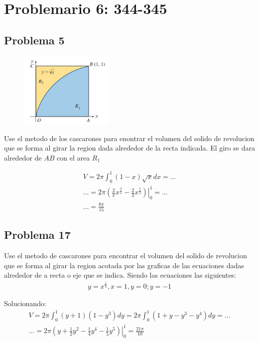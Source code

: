 \documentclass{article}
\begin{document}
\section{Problemario 6: 344-345}
\subsection{Problema 5}
\begin{figure}
  \includegraphics[width=0.4\textwidth]{multimedia/Problema5.jpeg}
\end{figure}
Use el metodo de los cascarones para enontrar el volumen del solido de revolucion que se forma al girar la region dada alrededor de la recta indicada.
El giro se dara alrededor de $ AB $ con el area $R_1$

\begin{align*}
  V = 2\pi\int_{0}^{1} (1-x)\sqrt{x}dx =\dots \\ \dots = 2\pi\left.\left(\frac{2}{\pi}x^{\frac{3}{2}}-\frac{2}{3}x^{\frac{5}{2}}\right)\right|_0^1 =\dots \\ \dots = \frac{8\pi}{15}
\end{align*}
\newline
\newline
\subsection{Problema 17}
Use el metodo de cascarones para encontrar el volumen del solido de revolucion que se forma al girar la region acotada por las graficas de las ecuaciones dadas alrededor de a recta o eje que se indica.
Siendo las ecuaciones las siguientes:
\begin{align*}
  y=x^{\frac{1}{3}},x=1,y=0;y=-1
\end{align*}
\begin{center}
\end{center}
Solucionando:
\begin{align*}
  V = 2\pi\int_{0}^{1}(y+1)(1-y^3)dy =2\pi \int_{0}^{1}(1+y-y^3-y^4)dy = \dots \\ \dots = 2\pi\left.\left(y+\frac{1}{2}y^2-\frac{1}{4}y^4-\frac{1}{5}y^5\right)\right|_0^1 = \frac{21\pi}{10}
\end{align*}
\end{document}
